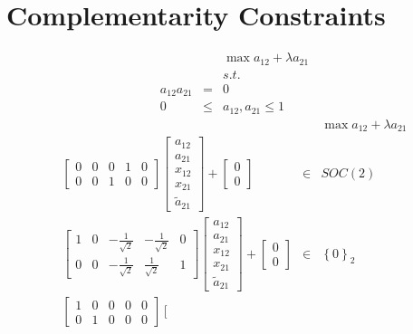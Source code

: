 \documentclass{article}
\begin{document}
\section{Complementarity Constraints}

\begin{eqnarray*}
&&\max a_{12}+\lambda a_{21} \\
&&s.t. \\
a_{12}a_{21} &=&0 \\
0 &\leq &a_{12},a_{21}\leq 1
\end{eqnarray*}%
\begin{eqnarray*}
&&\max a_{12}+\lambda a_{21} \\
\left[ 
\begin{array}{ccccc}
0 & 0 & 0 & 1 & 0 \\ 
0 & 0 & 1 & 0 & 0%
\end{array}%
\right] \left[ 
\begin{array}{c}
a_{12} \\ 
a_{21} \\ 
x_{12} \\ 
x_{21} \\ 
\tilde{a}_{21}%
\end{array}%
\right] +\left[ 
\begin{array}{c}
0 \\ 
0%
\end{array}%
\right]  &\in &SOC\left( 2\right)  \\
\left[ 
\begin{array}{ccccc}
1 & 0 & -\frac{1}{\sqrt{2}} & -\frac{1}{\sqrt{2}} & 0 \\ 
0 & 0 & -\frac{1}{\sqrt{2}} & \frac{1}{\sqrt{2}} & 1%
\end{array}%
\right] \left[ 
\begin{array}{c}
a_{12} \\ 
a_{21} \\ 
x_{12} \\ 
x_{21} \\ 
\tilde{a}_{21}%
\end{array}%
\right] +\left[ 
\begin{array}{c}
0 \\ 
0%
\end{array}%
\right]  &\in &\left\{ 0\right\} _{2} \\
\left[ 
\begin{array}{ccccc}
1 & 0 & 0 & 0 & 0 \\ 
0 & 1 & 0 & 0 & 0%
\end{array}%
\right] \left[ 
\begin{array}{c}

\end{array}
\end{eqnarray*}
\end{document}

